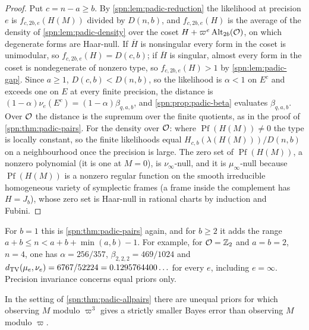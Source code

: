 \begin{proof}
Put $c=n-a\ge b$. By \cref{spn:lem:padic-reduction} the likelihood at precision $e$ is
$f_{c,2b,e}(H(M))$ divided by $D(n,b)$, and $f_{c,2b,e}(H)$ is the average of the density of
\cref{spn:lem:padic-density} over the coset $H+\varpi^e\operatorname{Alt}_{2b}(\mathcal{O})$, on which degenerate forms are
Haar-null. If $\overline H$ is nonsingular every form in the coset is unimodular, so $f_{c,2b,e}(H)=D(c,b)$;
if $\overline H$ is singular, almost every form in the coset is nondegenerate of nonzero type, so
$f_{c,2b,e}(H)>1$ by \cref{spn:lem:padic-gap}. Since $a\ge1$, $D(c,b)<D(n,b)$, so the likelihood is
$\alpha<1$ on $E^c$ and exceeds one on $E$ at every finite precision, the distance is
$(1-\alpha)\nu_e(E^c)=(1-\alpha)\beta_{q,a,b}$, and \cref{spn:prop:padic-beta} evaluates
$\beta_{q,a,b}$. Over $\mathcal{O}$ the distance is the supremum over the finite quotients, as in the proof of
\cref{spn:thm:padic-pairs}. For the density over $\mathcal{O}$: where $\operatorname{Pf}(H(M))\ne0$ the type is
locally constant, so the finite likelihoods equal $H_{c,b}(\lambda(H(M)))/D(n,b)$ on a neighbourhood once
the precision is large. The zero set of $\operatorname{Pf}(H(M))$, a nonzero polynomial (it is one at
$M=0$), is $\nu_\infty$-null, and it is $\mu_\infty$-null because $\operatorname{Pf}(H(M))$ is a nonzero
regular function on the smooth irreducible homogeneous variety of symplectic frames (a frame inside the
complement has $H=J_b$), whose zero set is Haar-null in rational charts by induction and Fubini.
\end{proof}

For $b=1$ this is \cref{spn:thm:padic-pairs} again, and for $b\ge2$ it adds the range
$a+b\le n<a+b+\min(a,b)-1$. For example, for $\mathcal{O}=\mathbb{Z}_2$ and $a=b=2$, $n=4$, one has $\alpha=256/357$,
$\beta_{2,2,2}=469/1024$ and $d_{\mathrm{TV}}(\mu_e,\nu_e)=6767/52224=0.1295764400\ldots$ for every $e$, including
$e=\infty$. Precision invariance concerns equal priors only.

\begin{proposition}\label{spn:prop:padic-priors}
In the setting of \cref{spn:thm:padic-allpairs} there are unequal priors for which observing $M$ modulo
$\varpi^3$ gives a strictly smaller Bayes error than observing $M$ modulo $\varpi$.
\end{proposition}


